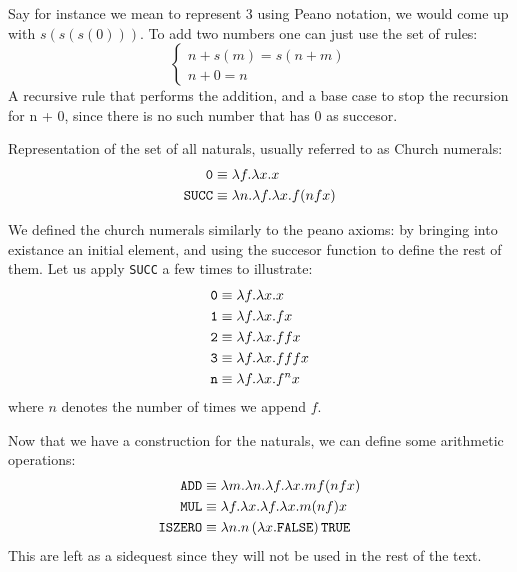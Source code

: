 \documentclass[12pt]{book}
\begin{document}
Say for instance we mean to represent $ 3 $ using Peano notation, we would come up with $ s(s(s(0))) $. To add two numbers one can just use the set of rules:
\[
  \begin{cases}
    n + s(m) = s(n + m) \\
    n + 0 = n
  \end{cases}
\]
A recursive rule that performs the addition, and a base case to stop the recursion for n + 0, since there is no such number that has $ 0 $ as succesor.
\begin{definition} Representation of the set of all naturals, usually referred to as Church numerals:
  \label{def:church-naturals}
  \begin{align*}
    \texttt{0} &\equiv \lambda f.\lambda x. x \\
    \texttt{SUCC} &\equiv \lambda n. \lambda f. \lambda x . f ( n f x )
  \end{align*}

\end{definition}
\begin{remark}
  We defined the church numerals similarly to the peano axioms: by bringing into existance an initial element, and using the succesor function to define the rest of them. Let us apply \texttt{SUCC} a few times to illustrate:
  \begin{align*}
    \texttt{0} &\equiv \lambda f.\lambda x. x \\
    \texttt{1} &\equiv \lambda f.\lambda x. f x \\
    \texttt{2} &\equiv \lambda f.\lambda x. f f x \\
    \texttt{3} &\equiv \lambda f.\lambda x. f f f x \\
    \texttt{n} &\equiv \lambda f.\lambda x. f ^ n x
  \end{align*}
  where $ n $ denotes the number of times we append $ f $.
\end{remark}
Now that we have a construction for the naturals, we can define some arithmetic operations:
\begin{align*}
  \texttt{ADD} &\equiv \lambda m.\lambda n. \lambda f. \lambda x. m f ( n f x) \\
  \texttt{MUL} &\equiv \lambda f.\lambda x. \lambda f. \lambda x. m (n f) x \\
  \texttt{ISZERO} &\equiv \lambda n. n\,(\lambda x.\texttt{FALSE})\,\texttt{TRUE}
\end{align*}
This are left as a sidequest since they will not be used in the rest of the text.
\end{document}
